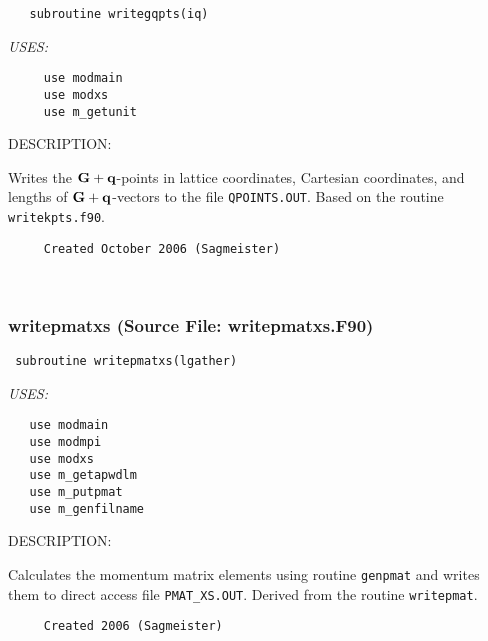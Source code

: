 \documentclass[11pt]{article}
\begin{document}
\begin{verbatim}   subroutine writegqpts(iq)\end{verbatim}{\em USES:}
\begin{verbatim}     use modmain
     use modxs
     use m_getunit\end{verbatim}
{\sf DESCRIPTION:\\ }


     Writes the ${\bf G+q}$-points in lattice coordinates, Cartesian 
     coordinates, and lengths of ${\bf G+q}$-vectors to the file 
     {\tt QPOINTS.OUT}. Based on the routine {\tt writekpts.f90}.
  
\begin{verbatim}     Created October 2006 (Sagmeister)\end{verbatim}








 
 
\mbox{}\hrulefill\ 
 
\subsubsection{writepmatxs (Source File: writepmatxs.F90)}


\begin{verbatim} subroutine writepmatxs(lgather)\end{verbatim}{\em USES:}
\begin{verbatim}   use modmain
   use modmpi
   use modxs
   use m_getapwdlm
   use m_putpmat
   use m_genfilname\end{verbatim}
{\sf DESCRIPTION:\\ }


     Calculates the momentum matrix elements using routine {\tt genpmat} and
     writes them to direct access file {\tt PMAT\_XS.OUT}. Derived from
     the routine {\tt writepmat}.
  
\begin{verbatim}     Created 2006 (Sagmeister)\end{verbatim}
\end{document}
